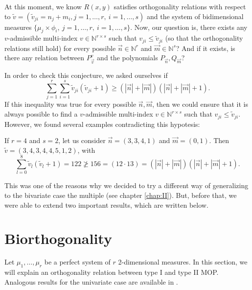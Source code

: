 \documentclass[12pt,a4]{report}
\theoremstyle{plain}
\newcommand{\N}[0]{\mathbb{N}}
\begin{document}
  At this moment, we know $R(x,y)$ satisfies orthogonality relations with respect to $\tilde v = \left(\tilde v_{ji} = n_j + m_i, j=1,\dots,r, \ i=1,\dots,s \right)$ and the system of bidimensional measures $\{\mu_j \times \phi_i, \ j=1,\dots,r, \ i=1,\dots,s\}$. Now, our question is, there exists any $v$-admissible multi-index $v\in \N^{r\times s}$ such that $v_{ji}\leq \tilde v_{ji}$ (so that the orthogonality relations still hold) for every possible $\vec n\in \N^r$ and $\vec m\in \N^s$? And if it exists, is there any relation between $P_{\vec v}^v$ and the polynomials $P_{\vec n}, Q_{\vec m}$?

  In order to check this conjecture, we asked ourselves if 
  $$
  \sum_{j=1}^r \sum_{i=1}^s \tilde v_{ji}(\tilde v_{ji}+1) \geq (|\vec n|+|\vec m|) (|\vec n|+|\vec m|+1).
  $$
  If this inequality was true for every possible $\vec n,\vec m$, then we could ensure that it is always possible to find a $v$-admissible multi-index $v\in \N^{r\times s}$ such that $v_{ji}\leq \tilde v_{ji}$. However, we found several examples contradicting this hypotesis:

  If $r=4$ and $s=2$, let us consider $\vec n = (3,3,4,1)$ and $\vec m = (0,1)$. Then $\tilde{v} = (3,4,3,4,4,5,1,2)$, with $$\sum_{l=0}^{8}\tilde v_l (\tilde v_l+1) = 122 \not\geq 156 = (12\cdot 13) = (|\vec n|+|\vec m|) (|\vec n|+|\vec m|+1).$$

  This was one of the reasons why we decided to try a different way of generalizing to the bivariate case the multiple  (see chapter \ref{chap:II}). But, before that, we were able to extend two important results, which are written below.



\section{Biorthogonality}

Let $\mu_1,\dots,\mu_r$ be a perfect system of $r$ 2-dimensional measures. In this section, we will explain an orthogonality relation between type I and type II MOP. Analogous results for the univariate case are available in \cite[Theorem 23.1.6]{Ismail}.
\end{document}
